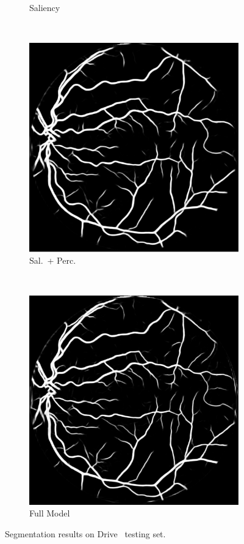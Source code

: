 \documentclass{scrartcl}
\begin{document}
\begin{figure}[t]
{\begin{subfigure}{0.2\textwidth}
    \caption{Saliency}
\end{subfigure}~
\begin{subfigure}{0.2\textwidth}
\centering
    \includegraphics[width=1.0\textwidth]{segmentation_nogan}
    \caption{Sal.\ + Perc.}
\end{subfigure}~
\begin{subfigure}{0.2\textwidth}
\centering
    \includegraphics[width=1.0\textwidth]{segmentation_gan}
    \caption{Full Model}
\end{subfigure}
}
\caption{Segmentation results on Drive~\cite{Drive} testing set.}
\label{fig:segmentation-example}
\end{figure}
\end{document}
